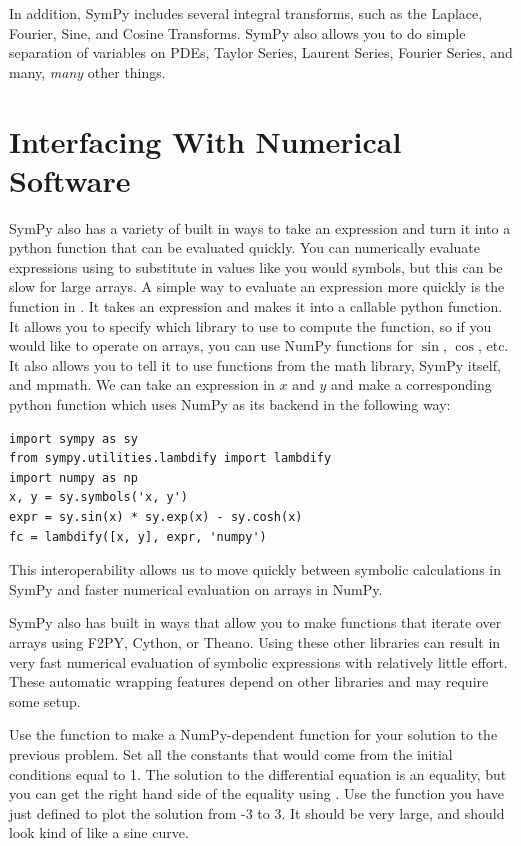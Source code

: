 In addition, SymPy includes several integral transforms, such as the Laplace, Fourier, Sine, and Cosine Transforms.
SymPy also allows you to do simple separation of variables on PDEs, Taylor Series, Laurent Series, Fourier Series, and many, \textit{many} other things.

\section*{Interfacing With Numerical Software}
SymPy also has a variety of built in ways to take an expression and turn it into a python function that can be evaluated quickly.
You can numerically evaluate expressions using  to substitute in values like you would symbols, but this can be slow for large arrays.
A simple way to evaluate an expression more quickly is the  function in .
It takes an expression and makes it into a callable python function. 
It allows you to specify which library to use to compute the function, so if you would like to operate on arrays, you can use NumPy functions for $\sin$, $\cos$, etc.
It also allows you to tell it to use functions from the math library, SymPy itself, and mpmath.
We can take an expression in $x$ and $y$ and make a corresponding python function  which uses NumPy as its backend in the following way:
\begin{lstlisting}
import sympy as sy
from sympy.utilities.lambdify import lambdify
import numpy as np
x, y = sy.symbols('x, y')
expr = sy.sin(x) * sy.exp(x) - sy.cosh(x)
fc = lambdify([x, y], expr, 'numpy')
\end{lstlisting}
This interoperability allows us to move quickly between symbolic calculations in SymPy and faster numerical evaluation on arrays in NumPy.

SymPy also has built in ways that allow you to make functions that iterate over arrays using F2PY, Cython, or Theano.
Using these other libraries can result in very fast numerical evaluation of symbolic expressions with relatively little effort.
These automatic wrapping features depend on other libraries and may require some setup.

\begin{problem}
Use the  function to make a NumPy-dependent function for your solution to the previous problem.
Set all the constants that would come from the initial conditions equal to 1.
The solution to the differential equation is an equality, but you can get the right hand side of the equality using .
Use the function you have just defined to plot the solution from -3 to 3.
It should be very large, and should look kind of like a sine curve.
\end{problem}
